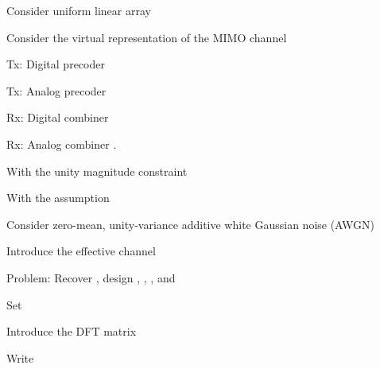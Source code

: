 
{
\I Consider uniform linear array

\I Consider the virtual representation of the MIMO channel
}

\page[yes] %

{
\I Tx: Digital precoder 

\I Tx: Analog precoder 

\I Rx: Digital combiner 

\I Rx: Analog combiner .

\I With the unity magnitude constraint

\I With the assumption 


\page[yes] %

{
\I Consider zero-mean, unity-variance additive white Gaussian noise (AWGN) 

\I Introduce the effective channel

\I Problem: Recover , design , , , and 
}
}

\page[yes] %

{
\I Set 

\I Introduce the DFT matrix 

\I Write 
}

\page[yes] %

